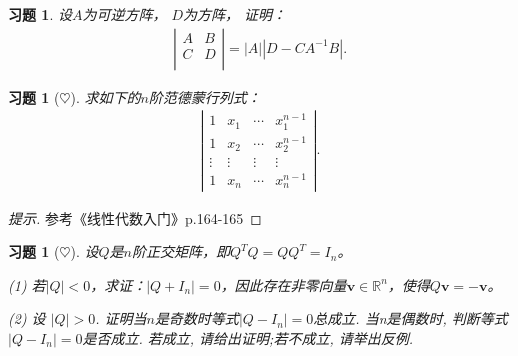 \documentclass[UTF8]{ctexart}
\newtheorem{ex}[thm]{习题}
\begin{document}
\begin{ex}
	设$A$为可逆方阵， $D$为方阵， 证明：
\begin{eqnarray*}
\left|
\begin{array}{cc}
A &B\\
C &D\\
\end{array}
\right|=|A||D-CA^{-1}B|.
\end{eqnarray*}
	\end{ex}



\begin{ex}[$\heartsuit $]
求如下的$n$阶范德蒙行列式：
\begin{eqnarray*}
\left|
\begin{array}{ccccc}
1 & x_1 & \cdots & x_1^{n-1}  \\
1 & x_2 & \cdots & x_2^{n-1}\\
\vdots & \vdots & \vdots & \vdots \\
1 & x_n & \cdots & x_n^{n-1}
\end{array}
\right|.
\end{eqnarray*}
\end{ex}
\begin{proof}[提示]参考《线性代数入门》p.164-165
\end{proof}

\begin{ex}[$\heartsuit $]
设$Q$是$n$阶正交矩阵，即$Q^TQ=QQ^T=I_n$。

(1) 若$|Q|<0$，求证：$|Q+I_n|=0$，因此存在非零向量$\mathbf{v} \in \mathbb{R}^n$，使得$Q\mathbf{v}=-\mathbf{v}$。

(2) 设 $|Q|>0$. 证明当$n$是奇数时等式$|Q-I_n|=0$总成立. 当n是偶数时, 判断等式$|Q-I_n|=0$是否成立. 若成立, 请给出证明;若不成立, 请举出反例.
\end{ex}
\end{document}

